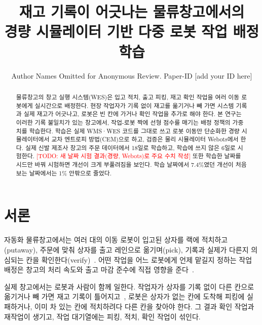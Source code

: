 \documentclass[conference]{IEEEtran}
\newcommand{\todo}[1]{\textcolor{red}{[TODO: #1]}}
\begin{document}
\title{재고 기록이 어긋나는 물류창고에서의\\경량 시뮬레이터 기반 다중 로봇 작업 배정 학습}

\author{Author Names Omitted for Anonymous Review. Paper-ID [add your ID here]}

\maketitle

\begin{abstract}
물류창고의 창고 실행 시스템(WES)은 입고 적치, 출고 피킹, 재고 확인 작업을 여러 이동 로봇에게 실시간으로 배정한다.
현장 작업자가 기록 없이 재고를 옮기거나 빼 가면 시스템 기록과 실제 재고가 어긋나고, 로봇은 빈 칸에 가거나 확인 작업을 추가로 해야 한다.
본 연구는 이러한 기록 불일치가 있는 창고에서, 작업-로봇 짝에 선형 점수를 매기는 배정 정책의 가중치를 학습한다.
학습은 실제 WMS·WES 코드를 그대로 쓰고 로봇 이동만 단순화한 경량 시뮬레이터에서 교차 엔트로피 방법(CEM)으로 하고, 검증은 물리 시뮬레이터 Webots에서 한다.
실제 신발 제조사 창고의 주문 데이터에서 18일로 학습하고, 학습에 쓰지 않은 6일로 시험한다.
\todo{새 날짜 시험 결과(경량, Webots)로 주요 수치 작성}
또한 학습한 날짜를 시드만 바꿔 시험하면 개선이 크게 부풀려짐을 보인다. 학습 날짜에서 7.4\%였던 개선이 처음 보는 날짜에서는 1\% 안팎으로 줄었다.
\end{abstract}

\IEEEpeerreviewmaketitle

\section{서론}

자동화 물류창고에서는 여러 대의 이동 로봇이 입고된 상자를 랙에 적치하고(putaway), 주문에 맞춰 상자를 출고 레인으로 옮기며(pick),
기록과 실제가 다른지 의심되는 칸을 확인한다(verify)~\cite{wurman2008}.
어떤 작업을 어느 로봇에게 언제 맡길지 정하는 작업 배정은 창고의 처리 속도와 출고 마감 준수에 직접 영향을 준다~\cite{gerkey2004}.

실제 창고에서는 로봇과 사람이 함께 일한다.
작업자가 상자를 기록 없이 다른 칸으로 옮기거나 빼 가면 재고 기록이 틀어지고~\cite{dehoratius2008},
로봇은 상자가 없는 칸에 도착해 피킹에 실패하거나, 이미 차 있는 칸에 적치하려다 다른 칸을 찾아야 한다.
그 결과 확인 작업과 재작업이 생기고, 작업 대기열에는 피킹, 적치, 확인 작업이 섞인다.
\end{document}
